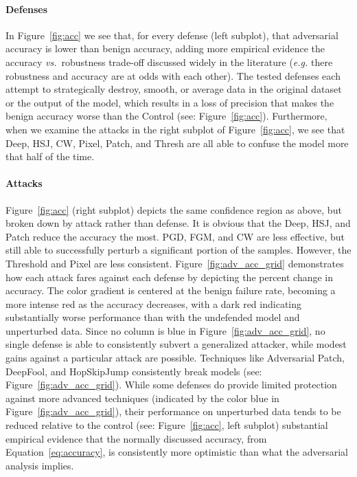 \documentclass[lettersize,journal]{IEEEtran}
\newcommand{\eg}{\textit{e.g.}\xspace}
\begin{document}
\paragraph{Defenses}
    In Figure~\ref{fig:acc} we see that, for every defense (left subplot), that adversarial accuracy is lower than benign accuracy, adding more empirical evidence the accuracy \textit{vs.}~robustness trade-off discussed widely in the literature (\eg there robustness and accuracy are at odds with each other). The tested defenses each attempt to strategically destroy, smooth, or average data in the original dataset or the output of the model, which results in a loss of precision that makes the benign accuracy worse than the Control (see: Figure~\ref{fig:acc}). Furthermore, when we examine the attacks in the right subplot of Figure~\ref{fig:acc}, we see that Deep, HSJ, CW, Pixel, Patch, and Thresh are all able to confuse the model more that half of the time. 

\paragraph{Attacks}
    Figure~\ref{fig:acc} (right subplot) depicts the same confidence region as above, but broken down by attack rather than defense. It is obvious that the Deep, HSJ, and Patch reduce the accuracy the most. PGD, FGM, and CW are less effective, but still able to successfully perturb a significant portion of the samples. However, the Threshold and Pixel are less consistent. Figure~\ref{fig:adv_acc_grid} demonstrates how each attack fares against each defense by depicting the percent change in accuracy. The color gradient is centered at the benign failure rate, becoming a more intense red as the accuracy decreases, with a dark red indicating substantially worse performance than with the undefended model and unperturbed data. Since no column is blue in Figure~\ref{fig:adv_acc_grid}, no single defense is able to consistently subvert a generalized attacker, while modest gains against a particular attack are possible. Techniques like Adversarial Patch, DeepFool, and HopSkipJump consistently break models (see: Figure~\ref{fig:adv_acc_grid}). While some defenses do provide limited protection against more advanced techniques (indicated by the color blue in Figure~\ref{fig:adv_acc_grid}), their performance on unperturbed data tends to be reduced relative to the control (see: Figure~\ref{fig:acc}, left subplot) substantial empirical evidence that the normally discussed accuracy, from Equation~\ref{eq:accuracy}, is consistently more optimistic than what the adversarial analysis implies.
\end{document}
